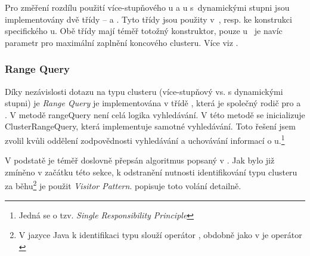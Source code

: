 Pro změření rozdílu použití více-stupňového \MIndex u a \MIndex u s~dynamickými stupni jsou implementovány dvě třídy -- \linebreak {} a \linebreak {}. Tyto třídy jsou použity v~, \linebreak resp.  ke konstrukci specifického \MIndex u.
Obě třídy mají téměř totožný konstruktor, pouze u~ je navíc parametr pro maximální zaplnění koncového clusteru. Více viz .

\subsubsection{Range Query}
Díky nezávislosti dotazu na typu clusteru (více-stupňový vs. s dynamickými stupni) je \emph{Range Query} je implementována v třídě , která je společný rodič pro  a . V metodě rangeQuery není celá logika vyhledávání. V této metodě se inicializuje ClusterRangeQuery, která implementuje samotné vyhledávání. Toto řešení jsem zvolil kvůli oddělení zodpovědnosti vyhledávání a uchovávání informací o \MIndex u.\footnote{Jedná se o tzv. \emph{Single Responsibility Principle}\cite{martin2003agile}}

V podstatě je téměř doslovně přepsán algoritmus popsaný v . Jak bylo již zmíněno v začátku této sekce, k odstranění nutnosti identifikování typu clusteru za běhu\footnote{V jazyce Java k identifikaci typu slouží operátor \cite{gosling2013java}, obdobně jako v \CC{} je operátor \cite{ISO:2012:CPP}} je použit \emph{Visitor Pattern}.  popisuje toto volání detailně.


%
%

